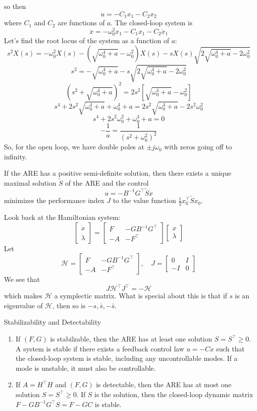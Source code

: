 \documentclass{article}
\begin{document}
so then
\[u = -C_1x_1 - C_2x_2\]
where $C_1$ and $C_2$ are functions of $a$. The closed-loop system is
\[\ddot{x} = -\omega_0^2x_1-C_1x_1-C_2\dot{x}_1\]
Let's find the root locus of the system as a function of $a$:
\[s^2X(s) = -\omega_0^2X(s)-\left(\sqrt{\omega_0^4+a}-\omega_0^2\right)X(s)
- sX(s)\sqrt{2\sqrt{\omega_0^4+a}-2\omega_0^2}\]
\[s^2 = -\sqrt{\omega_0^4+a} - s\sqrt{2\sqrt{\omega_0^4+a}-2\omega_0^2}\]
\[\left(s^2+\sqrt{\omega_0^4+a}\right)^2=2s^2\left[\sqrt{\omega_0^4+a}-\omega_0^2\right]\]
\[s^4+2s^2\sqrt{\omega_0^4+a}+\omega_0^4+a = 2s^2\sqrt{\omega_0^4+a}-2s^2\omega_0^2\]
\[s^4+2s^2\omega_0^2+\omega_0^4+a = 0\]
\[-\frac{1}{a} = \frac{1}{(s^2+\omega_0^2)^2}\]
So, for the open loop, we have double poles at $\pm j\omega_0$ with zeros going off to infinity.
\begin{theorem}
    If the ARE has a positive semi-definite solution, then there exists a unique maximal
    solution $\tilde{S}$ of the ARE and the control
    \[u = -B^{-1}G^\top\tilde{S}x\]
    minimizes the performance index $J$ to the value function $\frac{1}{2}x_0^\top\tilde{S}x_0$.
\end{theorem}
Look back at the Hamiltonian system:
\[\left[\begin{matrix}
    \dot{x} \\ \dot{\lambda}
\end{matrix}\right] = \left[\begin{matrix}
    F & -GB^{-1}G^\top \\
    -A & -F^\top
\end{matrix}\right]\left[\begin{matrix}
    x \\ \lambda
\end{matrix}\right]\]
Let
\[\mathcal{H} = \left[\begin{matrix}
    F & -GB^{-1}G^\top \\
    -A & -F^\top
\end{matrix}\right], \quad J = \left[\begin{matrix}
    0 & I \\
    -I & 0
\end{matrix}\right]\]
We see that
\[J\mathcal{H}^\top J^\top = -\mathcal{H}\]
which makes $\mathcal{H}$ a symplectic matrix. What is special about this is that
if $s$ is an eigenvalue of $\mathcal{H}$, then so is $-s, \bar{s}, -\bar{s}$.
\begin{theorem}
    Stabilizability and Detectability
    \begin{enumerate}
        \item If $(F,G)$ is stabilzable, then the ARE has at least one solution $S = S^\top \ge 0$.
        A system is stable if there exists a feedback control law $u = -Cx$ such that the closed-loop
        system is stable, including any uncontrollable modes. If a mode is unstable, it must
        also be controllable.
        \item If $A = H^\top H$ and $(F,G)$ is detectable, then the ARE has at most one solution
        $S = S^\top \ge 0$. If $S$ is the solution, then the closed-loop dynamic matrix
        $F-GB^{-1}G^\top S = F-GC$ is stable.
    \end{enumerate}
\end{theorem}
\end{document}
